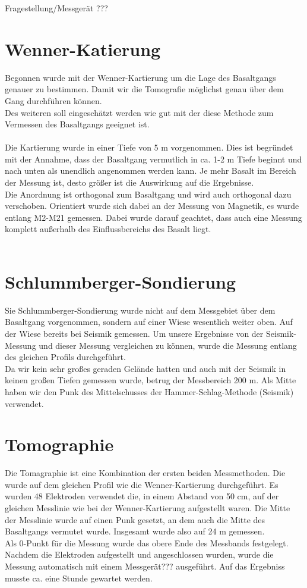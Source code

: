 
Fragestellung/Messgerät ???
\section{Wenner-Katierung}
Begonnen wurde mit der Wenner-Kartierung um die Lage des Basaltgangs genauer zu bestimmen. Damit wir die Tomografie möglichst genau über dem Gang durchführen
können. \\
Des weiteren soll eingeschätzt werden wie gut mit der diese Methode zum Vermessen des Basaltgangs geeignet ist.\\
\\
Die Kartierung wurde in einer Tiefe von 5 m vorgenommen. Dies ist begründet mit der Annahme, dass der Basaltgang vermutlich in ca. 1-2 m Tiefe beginnt und nach unten 
als unendlich angenommen werden kann. Je mehr Basalt im Bereich der Messung ist, desto größer ist die Auswirkung auf die Ergebnisse.\\
Die Anordnung ist orthogonal zum Basaltgang und wird auch orthogonal dazu verschoben. Orientiert wurde sich dabei an der Messung von Magnetik, es wurde 
entlang M2-M21 gemessen. Dabei wurde darauf geachtet, dass auch eine Messung komplett außerhalb 
des Einflussbereichs des Basalt liegt.\\
\\

\section{Schlummberger-Sondierung}
Sie Schlummberger-Sondierung wurde nicht auf dem Messgebiet über dem Basaltgang vorgenommen, sondern auf einer Wiese wesentlich weiter oben. Auf der Wiese 
bereits bei Seismik gemessen. Um unsere Ergebnisse von der Seismik-Messung und dieser Messung vergleichen zu können, wurde die Messung entlang des gleichen Profils durchgeführt. \\
Da wir kein sehr großes geraden Gelände hatten und auch mit der Seismik in keinen großen Tiefen gemessen wurde, betrug der Messbereich 200 m. Als Mitte 
haben wir den Punk des Mittelschusses der Hammer-Schlag-Methode (Seismik) verwendet.

\section{Tomographie}
Die Tomagraphie ist eine Kombination der ersten beiden Messmethoden. Die wurde auf dem gleichen Profil wie die Wenner-Kartierung durchgeführt.
Es wurden 48 Elektroden verwendet die, in einem Abstand von 50 cm, auf der gleichen Messlinie wie bei der Wenner-Kartierung aufgestellt waren. 
Die Mitte der Messlinie wurde auf einen Punk gesetzt, an dem auch die Mitte des Basaltgangs vermutet wurde. Insgesamt wurde also auf 24 m gemessen.\\
Als 0-Punkt für die Messung wurde das obere Ende des Messbands festgelegt.
Nachdem die Elektroden aufgestellt und angeschlossen wurden, wurde die Messung automatisch mit einem Messgerät??? ausgeführt. Auf das Ergebniss musste ca. 
eine Stunde gewartet werden.